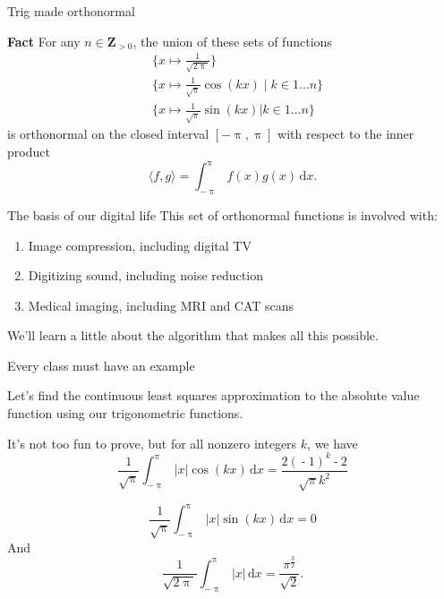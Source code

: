 \documentclass[portrait,fleqn,12pt]{beamer}
\newcommand{\integers}{\mathbf{Z}}
\begin{document}
\begin{frame}{Trig made orthonormal}

\textbf{Fact} For any $n \in \integers_{>0}$, the union of these 
sets of functions
\begin{align*}
   &\{x \mapsto \frac{1}{\sqrt{2 \uppi}} \}  \\
   &\{ x \mapsto \frac{1}{\sqrt{\uppi}} \cos(k x) \mid k \in 1 \dots n \}
   \\ 
   &\{ x \mapsto \frac{1}{\sqrt{\uppi}} \sin(k x) \vert k \in 1 \dots n \} 
\end{align*}
  is orthonormal on the closed interval $[-\uppi, \uppi]$ with respect
  to the inner product
  \begin{equation*}
     \langle f, g \rangle = \int_{-\uppi}^\uppi f(x) g(x) \, \mathrm{d} x.
  \end{equation*}
\end{frame}

\begin{frame}{The basis of our digital life}
  This set of orthonormal functions is involved with:
  \begin{enumerate}
    \item Image compression, including digital TV
    \item Digitizing sound, including noise reduction
    \item Medical imaging, including MRI and CAT scans
  \end{enumerate}
  We'll learn a little about the algorithm that makes all this possible.

\end{frame}
\begin{frame}{Every class must have an example}

Let's find the continuous least squares approximation to the 
absolute value function using our trigonometric functions.

It's not too fun to prove, but for all nonzero integers $k$, we have
\begin{equation*}
  \frac{1}{\sqrt{\uppi}} \int_{-\uppi}^\uppi |x| \cos(k x) \, 
   \mathrm{d} x =  \frac{2 {{\left( \operatorname{-}1\right) }^{k}}\operatorname{-}2}{\sqrt{\ensuremath{\pi} } {{k}^{2}}}
\end{equation*}

\begin{equation*}
  \frac{1}{\sqrt{\uppi}} \int_{-\uppi}^\uppi |x| \sin(k x) \, 
   \mathrm{d} x =  0
\end{equation*}
And 
\begin{equation*}
  \frac{1}{\sqrt{2 \uppi}} \int_{-\uppi}^\uppi |x|  \, 
   \mathrm{d} x =  \frac{{{\ensuremath{\pi} }^{\frac{3}{2}}}}{\sqrt{2}}.
\end{equation*}


  
\end{frame}
\end{document}
